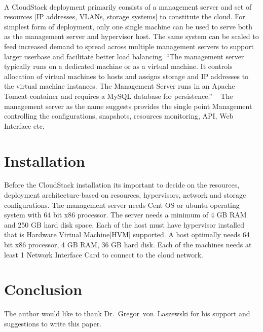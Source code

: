 \paragraph {} A CloudStack deployment primarily consists of a management server and
set of resources [IP addresses, VLANs, storage systems] to constitute
the cloud.  For simplest form of deployment, only one single machine
can be used to serve both as the management server and hypervisor
host. The same system can be scaled to feed increased demand to spread
across multiple management servers to support larger userbase and
facilitate better load balancing. ``The management server typically runs
on a dedicated machine or as a virtual machine. It controls allocation
of virtual machines to hosts and assigns storage and IP addresses to
the virtual machine instances. The Management Server runs in an Apache
Tomcat container and requires a MySQL database for
persistence.'' ~\cite{hid-sp18-417-www-cloudstack-management-server} 
The management server as the name suggests provides the single point 
Management controlling the configurations, snapshots, resources monitoring, 
API, Web Interface etc. 



\section{Installation}

Before the CloudStack installation its important to decide on the resources,
deployment architecture-based on resources, hypervisors, network and storage 
configurations. The management server needs Cent OS or ubuntu operating system
with 64 bit x86 processor. The server needs a minimum of 4 GB RAM and 250 GB
hard disk space. Each of the host must have hypervisor installed that is Hardware
Virtual Machine[HVM] supported. A host optimally needs 64 bit x86 processor, 4 GB
RAM, 36 GB hard disk. Each of the machines needs at least 1 Network Interface Card 
to connect to the cloud network.  

\section{Conclusion}

\begin{acks}

  The author would like to thank Dr.~Gregor~von~Laszewski for his
  support and suggestions to write this paper.

\end{acks}


 
